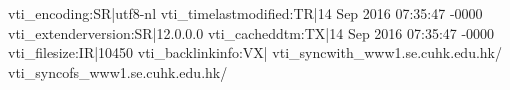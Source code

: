 vti_encoding:SR|utf8-nl
vti_timelastmodified:TR|14 Sep 2016 07:35:47 -0000
vti_extenderversion:SR|12.0.0.0
vti_cacheddtm:TX|14 Sep 2016 07:35:47 -0000
vti_filesize:IR|10450
vti_backlinkinfo:VX|
vti_syncwith_www1.se.cuhk.edu.hk/%
vti_syncofs_www1.se.cuhk.edu.hk/%
